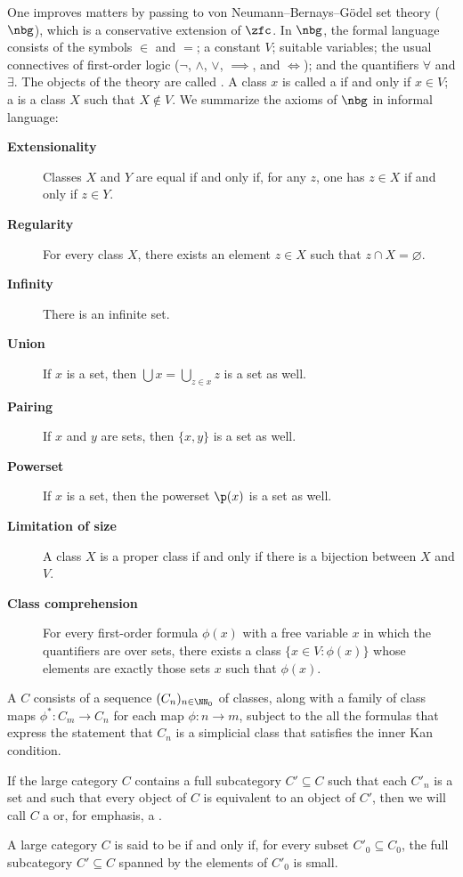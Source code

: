 One improves matters by passing to von Neumann--Bernays--Gödel set theory ($\nbg$),
which is a conservative extension of $\zfc$.
In $ \nbg $, the formal language consists of the symbols $\in$ and $=$;
a constant $V$; suitable variables;
the usual connectives of first-order logic ($\neg$, $\wedge$, $\vee$, $\implies$, and $\iff$);
and the quantifiers $\forall$ and $\exists$.
The objects of the theory are called .
A class $ x $ is called a  if and only if $x \in V$;
a  is a class $ X $ such that $ X \notin V $.
We summarize the axioms of $ \nbg $ in informal language:
\begin{description}
	\item[\textbf{Extensionality}] Classes $ X $ and $ Y $ are equal if and only if,
		for any $ z $, one has $ z \in X $ if and only if $ z \in Y $.
	\item[\textbf{Regularity}] For every class $ X $,
		there exists an element $ z \in X $ such that $ z \cap X = \varnothing $.
	\item[\textbf{Infinity}] There is an infinite set.
	\item[\textbf{Union}] If $ x $ is a set, then $ \bigcup x = \bigcup_{z \in x} z $ is a set as well.
	\item[\textbf{Pairing}] If $ x $ and $ y $ are sets, then $ \{x,y\} $ is a set as well.
	\item[\textbf{Powerset}] If $ x $ is a set, then the powerset $ \p(x) $ is a set as well.
	\item[\textbf{Limitation of size}] A class $X$ is a proper class if and only if
		there is a bijection between $X$ and $V$.
	\item[\textbf{Class comprehension}] For every first-order formula $ \phi(x) $ with a free variable $ x $ in which the quantifiers are over sets,
		there exists a class $ \{ x \in V : \phi(x) \} $ whose elements are exactly those sets $ x $ such that $ \phi(x) $.
\end{description}

\begin{definition}
	A  $C$ consists of a sequence $(C_n)_{n\in\NN_0}$ of classes,
	along with a family of class maps $ \phi^{\ast} \colon C_m \to C_n $ for each map $ \phi \colon n \to m $,
	subject to the all the formulas that express the statement that $C_n$ is a simplicial class
	that satisfies the inner Kan condition.

	If the large category $C$ contains a full subcategory $ C' \subseteq C $
	such that each $ C'_n $ is a set and such that every object of $ C $ is equivalent to an object of $ C' $,
	then we will call $ C $ a 
	or, for emphasis, a .
	
	A large category $ C $ is said to be  if and only if,
	for every subset $ C'_0 \subseteq C_0$,
	the full subcategory $ C' \subseteq C $ spanned by the elements of $ C'_0 $ is small.
\end{definition}

